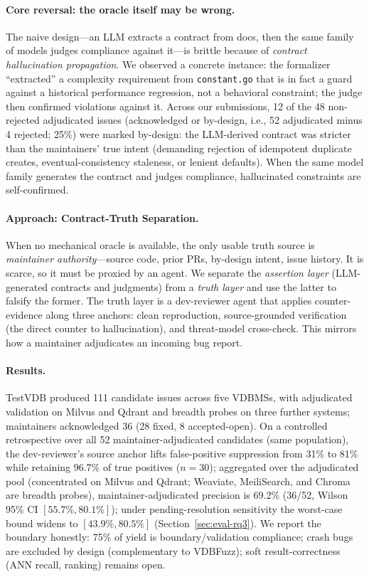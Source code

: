\documentclass[sigconf]{acmart}
\begin{document}
\paragraph{Core reversal: the oracle itself may be wrong.}
The naive design---an LLM extracts a contract from docs, then the same family of models judges compliance against it---is brittle because of \emph{contract hallucination propagation}. We observed a concrete instance: the formalizer ``extracted'' a complexity requirement from \texttt{constant.go} that is in fact a guard against a historical performance regression, not a behavioral constraint; the judge then confirmed violations against it. Across our submissions, 12 of the 48 non-rejected adjudicated issues (acknowledged or by-design, i.e., 52 adjudicated minus 4 rejected; 25\%) were marked by-design: the LLM-derived contract was stricter than the maintainers' true intent (demanding rejection of idempotent duplicate creates, eventual-consistency staleness, or lenient defaults). When the same model family generates the contract and judges compliance, hallucinated constraints are self-confirmed.

\paragraph{Approach: Contract-Truth Separation.}
When no mechanical oracle is available, the only usable truth source is \emph{maintainer authority}---source code, prior PRs, by-design intent, issue history. It is scarce, so it must be proxied by an agent. We separate the \emph{assertion layer} (LLM-generated contracts and judgments) from a \emph{truth layer} and use the latter to falsify the former. The truth layer is a dev-reviewer agent that applies counter-evidence along three anchors: clean reproduction, source-grounded verification (the direct counter to hallucination), and threat-model cross-check. This mirrors how a maintainer adjudicates an incoming bug report.

\paragraph{Results.}
TestVDB produced 111 candidate issues across five VDBMSs, with adjudicated validation on Milvus and Qdrant and breadth probes on three further systems; maintainers acknowledged 36 (28 fixed, 8 accepted-open). On a controlled retrospective over all 52 maintainer-adjudicated candidates (same population), the dev-reviewer's source anchor lifts false-positive suppression from 31\% to 81\% while retaining 96.7\% of true positives ($n{=}30$); aggregated over the adjudicated pool (concentrated on Milvus and Qdrant; Weaviate, MeiliSearch, and Chroma are breadth probes), maintainer-adjudicated precision is 69.2\% (36/52, Wilson 95\% CI $[55.7\%, 80.1\%]$); under pending-resolution sensitivity the worst-case bound widens to $[43.9\%, 80.5\%]$ (Section~\ref{sec:eval-rq3}). We report the boundary honestly: 75\% of yield is boundary/validation compliance; crash bugs are excluded by design (complementary to VDBFuzz); soft result-correctness (ANN recall, ranking) remains open.
\end{document}
